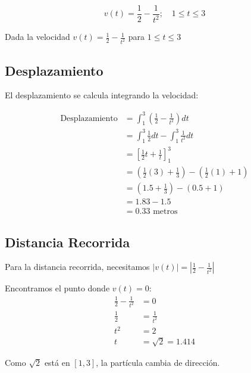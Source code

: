 \documentclass[11pt,letterpaper]{article}
\begin{document}
\begin{equation*}
    v(t) = \frac{1}{2} - \frac{1}{t^2}; \quad 1 \leq t \leq 3
\end{equation*}

Dada la velocidad $v(t) = \frac{1}{2} - \frac{1}{t^2}$ para $1 \leq t \leq 3$

\subsection*{Desplazamiento}

El desplazamiento se calcula integrando la velocidad:

\begin{align*}
\text{Desplazamiento} &= \int_{1}^{3} \left(\frac{1}{2} - \frac{1}{t^2}\right)dt \\
&= \int_{1}^{3} \frac{1}{2}dt - \int_{1}^{3} \frac{1}{t^2}dt \\
&= \left[\frac{1}{2}t + \frac{1}{t}\right]_{1}^{3} \\
&= \left(\frac{1}{2}(3) + \frac{1}{3}\right) - \left(\frac{1}{2}(1) + 1\right) \\
&= \left(1.5 + \frac{1}{3}\right) - (0.5 + 1) \\
&= 1.83 - 1.5 \\
&= 0.33 \text{ metros}
\end{align*}

\subsection*{Distancia Recorrida}

Para la distancia recorrida, necesitamos $|v(t)| = \left|\frac{1}{2} - \frac{1}{t^2}\right|$

Encontramos el punto donde $v(t) = 0$:
\begin{align*}
\frac{1}{2} - \frac{1}{t^2} &= 0 \\
\frac{1}{2} &= \frac{1}{t^2} \\
t^2 &= 2 \\
t &= \sqrt{2} = 1.414
\end{align*}

Como $\sqrt{2}$ está en $[1,3]$, la partícula cambia de dirección.
\end{document}
